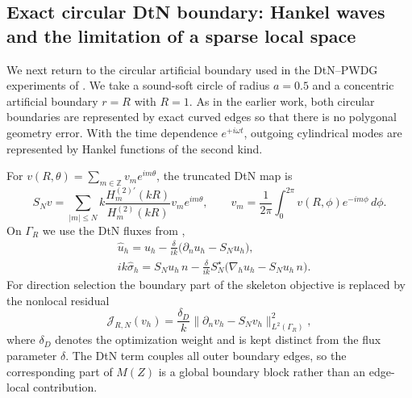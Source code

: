 \documentclass[pdflatex,sn-mathphys-num]{sn-jnl}
\theoremstyle{thmstyleone}
\theoremstyle{thmstyletwo}
\begin{document}
\subsection{Exact circular DtN boundary: Hankel waves and the limitation of a sparse local space}\label{subsec:dtn-hankel}
We next return to the circular artificial boundary used in the DtN--PWDG experiments of \cite{KapitaMonk2018}.  We take a sound-soft circle of radius $a=0.5$ and a concentric artificial boundary $r=R$ with $R=1$.  As in the earlier work, both circular boundaries are represented by exact curved edges so that there is no polygonal geometry error.  With the time dependence $e^{+i\omega t}$, outgoing cylindrical modes are represented by Hankel functions of the second kind.

For $v(R,\theta)=\sum_{m\in\mathbb Z}v_m e^{im\theta}$, the truncated DtN map is
\begin{equation}\label{eq:dtn-map-new}
 S_N v=\sum_{|m|\le N} k\frac{H_m^{(2)\prime}(kR)}{H_m^{(2)}(kR)}v_m e^{im\theta},
 \qquad
 v_m=\frac{1}{2\pi}\int_0^{2\pi}v(R,\phi)e^{-im\phi}\,d\phi .
\end{equation}
On $\Gamma_R$ we use the DtN fluxes from \cite{KapitaMonk2018},
\begin{equation}\label{eq:dtn-flux-new}
\begin{aligned}
&\widehat u_h=u_h-\frac{\delta}{ik}\big(\partial_nu_h-S_Nu_h\big),\\
&ik\widehat\sigma_h=S_Nu_h\,n-\frac{\delta}{ik}S_N^\star\big(\nabla_hu_h-S_Nu_h\,n\big).
\end{aligned}
\end{equation}
For direction selection the boundary part of the skeleton objective is replaced by the nonlocal residual
\begin{equation}\label{eq:dtn-residual-new}
 \mathcal J_{R,N}(v_h)=\frac{\delta_D}{k}\|\partial_n v_h-S_Nv_h\|_{L^2(\Gamma_R)}^2,
\end{equation}
where $\delta_D$ denotes the optimization weight and is kept distinct from the flux parameter $\delta$.  The DtN term couples all outer boundary edges, so the corresponding part of $M(Z)$ is a global boundary block rather than an edge-local contribution.
\end{document}
